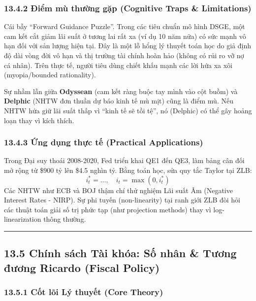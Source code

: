 \documentclass[
]{article}
\begin{document}
\subsubsection{13.4.2 Điểm mù thường gặp (Cognitive Traps \&
Limitations)}\label{ux111iux1ec3m-muxf9-thux1b0ux1eddng-gux1eb7p-cognitive-traps-limitations-93}

Cái bẫy ``Forward Guidance Puzzle''. Trong các tiêu chuẩn mô hình DSGE,
một cam kết cắt giảm lãi suất ở tương lai rất xa (ví dụ 10 năm nữa) có
sức mạnh vô hạn đối với sản lượng hiện tại. Đây là một lỗ hổng lý thuyết
toán học do giả định độ dài vòng đời vô hạn và thị trường tài chính hoàn
hảo (không có rủi ro vỡ nợ cá nhân). Trên thực tế, người tiêu dùng chiết
khấu mạnh các lời hứa xa xôi (myopia/bounded rationality).

Sự nhầm lẫn giữa \textbf{Odyssean} (cam kết ràng buộc tay mình vào cột
buồm) và \textbf{Delphic} (NHTW đơn thuần dự báo kinh tế mù mịt) cũng là
điểm mù. Nếu NHTW hứa giữ lãi suất thấp vì ``kinh tế sẽ tồi tệ'', nó
(Delphic) có thể gây hoảng loạn thay vì kích thích.

\subsubsection{13.4.3 Ứng dụng thực tế (Practical
Applications)}\label{ux1ee9ng-dux1ee5ng-thux1ef1c-tux1ebf-practical-applications-49}

Trong Đại suy thoái 2008-2020, Fed triển khai QE1 đến QE3, làm bảng cân
đối mở rộng từ \$900 tỷ lên \$4.5 nghìn tỷ. Bằng toán học, sửa quy tắc
Taylor tại ZLB: \[ i_t^* = \dots, \quad i_t = \max(0, i_t^*) \] Các NHTW
như ECB và BOJ thậm chí thử nghiệm Lãi suất Âm (Negative Interest Rates
- NIRP). Sự phi tuyến (non-linearity) tại ranh giới ZLB đòi hỏi các
thuật toán giải số trị phức tạp (như projection methods) thay vì
log-linearization thông thường.

\begin{center}\rule{0.5\linewidth}{0.5pt}\end{center}

\subsection{13.5 Chính sách Tài khóa: Số nhân \& Tương đương Ricardo
(Fiscal
Policy)}\label{chuxednh-suxe1ch-tuxe0i-khuxf3a-sux1ed1-nhuxe2n-tux1b0ux1a1ng-ux111ux1b0ux1a1ng-ricardo-fiscal-policy}

\subsubsection{13.5.1 Cốt lõi Lý thuyết (Core
Theory)}\label{cux1ed1t-luxf5i-luxfd-thuyux1ebft-core-theory-43}
\end{document}
